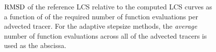 \begin{figure}[htpb]
    \centering
        
    \caption[$\rmsd$ of the reference LCS relative to the computed LCS
    curves as a function of the required number of function evaluations
    per advected tracer]
    {$\rmsd$ of the reference LCS relative to the computed LCS curves as a
        function of of the required number of function evaluations per advected tracer.
        For the adaptive stepsize methods, the \emph{average} number of function
    evaluations across all of the advected tracers is used as the abscissa.}
    \label{fig:lcs_rmsd_fn_nn_both}
\end{figure}
